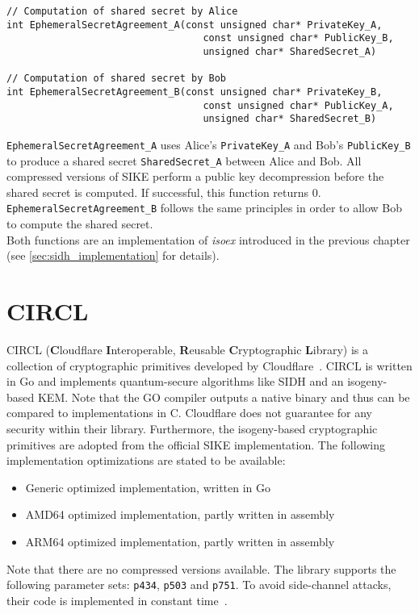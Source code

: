 \begin{lstlisting}[]
// Computation of shared secret by Alice
int EphemeralSecretAgreement_A(const unsigned char* PrivateKey_A, 
								  const unsigned char* PublicKey_B,
								  unsigned char* SharedSecret_A)
								  
// Computation of shared secret by Bob
int EphemeralSecretAgreement_B(const unsigned char* PrivateKey_B, 
								  const unsigned char* PublicKey_A,
								  unsigned char* SharedSecret_B)
\end{lstlisting}
\texttt{EphemeralSecretAgreement\_A} uses Alice's \texttt{PrivateKey\_A} and Bob's \texttt{PublicKey\_B} to produce a shared secret \texttt{SharedSecret\_A} between Alice and Bob. All compressed versions of \gls{SIKE} perform a public key decompression before the shared secret is computed. If successful, this function returns 0. \texttt{EphemeralSecretAgreement\_B} follows the same principles in order to allow Bob to compute the shared secret.\\
Both functions are an implementation of \textit{isoex} introduced in the previous chapter (see \autoref{sec:sidh_implementation} for details).
\newpage
\section{\gls{CIRCL}} \label{sec:circl_description}

\gls{CIRCL} (\textbf{C}loudflare \textbf{I}nteroperable, \textbf{R}eusable \textbf{C}ryptographic \textbf{L}ibrary) is a collection of cryptographic primitives developed by Cloudflare~\parencite{circl2020github}. \gls{CIRCL} is written in Go and implements quantum-secure algorithms like \gls{SIDH} and an isogeny-based \gls{KEM}. Note that the GO compiler outputs a native binary and thus can be compared to implementations in C.  Cloudflare does not guarantee for any security within their library. Furthermore, the isogeny-based cryptographic primitives are adopted from the official \gls{SIKE} implementation. The following implementation optimizations are stated to be available:

\begin{itemize}
  \item Generic optimized implementation, written in Go 
  \item AMD64 optimized implementation, partly written in assembly
  \item ARM64 optimized implementation, partly written in assembly
\end{itemize}
Note that there are no compressed versions available. The library supports the following parameter sets: \texttt{p434}, \texttt{p503} and \texttt{p751}. To avoid side-channel attacks, their code is implemented in constant time~\parencite{circl2019intro}.


